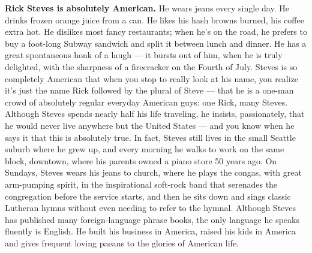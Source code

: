 \textbf{Rick Steves is absolutely American.} He wears jeans every single
day. He drinks frozen orange juice from a can. He likes his hash browns
burned, his coffee extra hot. He dislikes most fancy restaurants; when
he's on the road, he prefers to buy a foot-long Subway sandwich and
split it between lunch and dinner. He has a great spontaneous honk of a
laugh --- it bursts out of him, when he is truly delighted, with the
sharpness of a firecracker on the Fourth of July. Steves is so
completely American that when you stop to really look at his name, you
realize it's just the name Rick followed by the plural of Steve --- that
he is a one-man crowd of absolutely regular everyday American guys: one
Rick, many Steves. Although Steves spends nearly half his life
traveling, he insists, passionately, that he would never live anywhere
but the United States --- and you know when he says it that this is
absolutely true. In fact, Steves still lives in the small Seattle suburb
where he grew up, and every morning he walks to work on the same block,
downtown, where his parents owned a piano store 50 years ago. On
Sundays, Steves wears his jeans to church, where he plays the congas,
with great arm-pumping spirit, in the inspirational soft-rock band that
serenades the congregation before the service starts, and then he sits
down and sings classic Lutheran hymns without even needing to refer to
the hymnal. Although Steves has published many foreign-language phrase
books, the only language he speaks fluently is English. He built his
business in America, raised his kids in America and gives frequent
loving paeans to the glories of American life.

